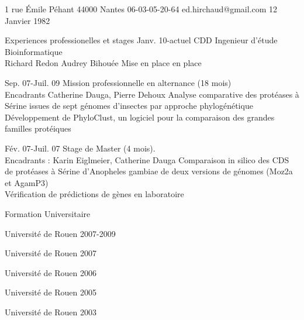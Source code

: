 \documentclass[a4paper, 11pt]{article}
\begin{document}
 


{1 rue Émile Péhant} 
{44000 Nantes} 
{06-03-05-20-64} 
{ed.hirchaud@gmail.com} 
{12 Janvier 1982} 




\Summary{ }
 
\begin{Section}{Experiences professionelles et stages}
{Janv. 10-actuel}
{CDD Ingenieur d'étude Bioinformatique\\ Richard Redon Audrey Bihouée}
{Mise en place en place }

{Sep. 07-Juil. 09}
{Mission professionnelle en alternance (18 mois) \\ Encadrants Catherine Dauga, Pierre Dehoux}
{Analyse comparative des protéases à Sérine issues de sept génomes d'insectes par approche phylogénétique
 \\
 Développement de PhyloClust, un logiciel pour la comparaison des grandes familles protéiques}

{Fév. 07-Juil. 07} 
{Stage de Master (4 mois). \\  Encadrants : Karin Eiglmeier, Catherine Dauga} 
{Comparaison in silico des CDS de protéases à Sérine d'Anopheles gambiae de deux versions de génomes (Moz2a et AgamP3)\\
Vérification de prédictions de gènes en laboratoire}

\end{Section}
\begin{Section}{Formation Universitaire}

{Université de Rouen}
{ }
{2007-2009}

{Université de Rouen}
{ }
{2007}

{Université de Rouen}
{ }
{2006}

{Université de Rouen}
{ }
{2005}

{Université de Rouen}
{ }
{2003}

\end{Section}
\end{document}
